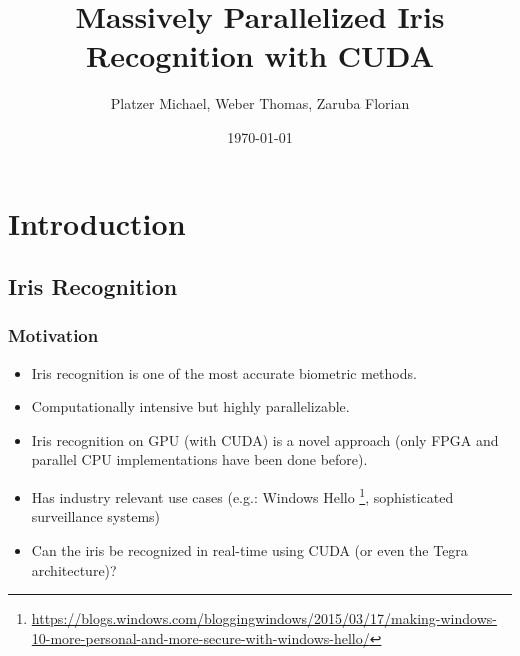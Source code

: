 \documentclass{beamer}
\begin{document}
 
\title[Massively Parallelized Iris Recognition with CUDA]{Massively Parallelized Iris Recognition with CUDA} 
\author[Platzer M., Weber T., Zaruba F.]{Platzer Michael, Weber Thomas, Zaruba Florian} 
\date{\today} 
\begin{frame}
	\titlepage 
\end{frame}

\section{Introduction} 
\subsection{Iris Recognition} 
\begin{frame}\frametitle{Motivation} 
	\begin{itemize}
		\item Iris recognition is one of the most accurate biometric methods.
		\item Computationally intensive but highly parallelizable.
		\item Iris recognition on GPU (with CUDA) is a novel approach (only FPGA and parallel CPU implementations have been done before).
		\item Has industry relevant use cases (e.g.: Windows Hello \footnote{\url{https://blogs.windows.com/bloggingwindows/2015/03/17/making-windows-10-more-personal-and-more-secure-with-windows-hello/}}, sophisticated surveillance systems)
		\item Can the iris be recognized in real-time using CUDA (or even the Tegra architecture)?
	\end{itemize}
\end{frame}
\end{document}
